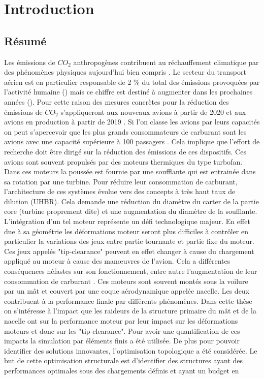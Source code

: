 \chapter*{Introduction}
\label{chap:introduction}
\begin{mdframed}[hidealllines=true,backgroundcolor=lightgray!20]
\section*{Résumé}
Les émissions de $CO_2$ anthropogènes contribuent au réchauffement climatique par des phénomènes physiques aujourd'hui bien compris \cite{change2007physical}. Le secteur du transport aérien est en particulier responsable de 2 $\%$  du total des émissions provoquées par l'activité humaine (\cite{icao2016environmental}) mais ce chiffre est destiné à augmenter dans les prochaines années (\cite{terrenoire2019contribution}).  Pour cette raison des mesures concrètes pour la réduction des émissions de $CO_2$ s'appliqueront aux nouveaux avions à partir de 2020 et aux avions en production à partir de 2019 \cite{national2016commercial}. Si l'on classe les avions par leurs capacités on peut s'apercevoir que les plus grands consommateurs de carburant sont les avions avec une capacité supérieure à 100 passagers \cite{yutko2011approaches,epstein2019considerations}. Cela implique que l'effort de recherche doit être dirigé sur la réduction des émissions de ces dispositifs. Ces avions sont souvent propulsés par des moteurs thermiques du type turbofan. Dans ces moteurs la poussée est fournie par une soufflante qui est entrainée dans sa rotation par une turbine. Pour réduire leur consommation de carburant, l'architecture de ces systèmes évolue vers des concepts à très haut taux de dilution (UHBR). Cela demande une réduction du diamètre du carter de la partie core (turbine proprement dite) et une augmentation du diamètre de la soufflante. L'intégration d'un tel moteur représente un défi technologique majeur. En effet due à sa géométrie les déformations moteur seront plus difficiles à contrôler en particulier la variations des jeux entre partie tournante et partie fixe du moteur. Ces jeux appelés "tip-clearance" peuvent en effet changer à cause du chargement appliqué au moteur à cause des manœuvres de l'avion. Cela a différentes conséquences néfastes sur son fonctionnement, entre autre l'augmentation de leur consommation de carburant \cite{lattime2002turbine}.  Ces moteurs sont souvent montés sous la voilure par un mât et couvert par une coque aérodynamique appelée nacelle. Les deux contribuent à la performance finale par différents phénomènes. Dans cette thèse on s'intéresse à l'impact que les raideurs de la structure primaire du mât et de la nacelle ont sur la performance moteur par leur impact sur les déformations moteurs et donc sur les "tip-clearance". Pour avoir une quantification de ces impacts la simulation par éléments finis a été utilisée. De plus pour pouvoir identifier des solutions innovantes, l'optimisation topologique a été considérée. Le but de cette optimisation structurale est d'identifier des structures ayant des performances optimales sous des chargements définis et ayant un budget en 
\end{mdframed}
